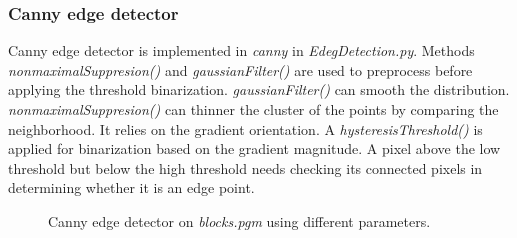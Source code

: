 \documentclass[paper=a4, fontsize=11pt]{scrartcl}
\numberwithin{equation}{section}		%
\numberwithin{figure}{section}			%
\begin{document}
\subsubsection{Canny edge detector}

Canny edge detector is implemented in \emph{canny} in \emph{EdegDetection.py}.
Methods \emph{nonmaximalSuppresion()} and \emph{gaussianFilter()} are used to preprocess before applying the threshold binarization.
\emph{gaussianFilter()} can smooth the distribution.
\emph{nonmaximalSuppresion()} can thinner the cluster of the points by comparing the neighborhood.
It relies on the gradient orientation.
A \emph{hysteresisThreshold()} is applied for binarization based on the gradient magnitude.
A pixel above the low threshold but below the high threshold needs checking its connected pixels in determining whether it is an edge point.


\begin{figure}[h]
\centering
{}
\caption{Canny edge detector on \emph{blocks.pgm} using different parameters.}
\label{fig:edge:02:canny}
\end{figure}
\end{document}
